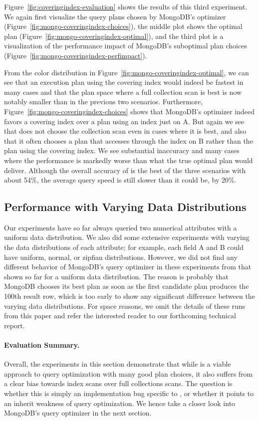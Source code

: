 Figure~\ref{fig:coveringindex-evaluation} shows the results of this third experiment. We again first visualize the query plans chosen by MongoDB's \approachName optimizer (Figure~\ref{fig:mongo-coveringindex-choices}), the middle plot shows the optimal plan (Figure~\ref{fig:mongo-coveringindex-optimal}), and the third plot is a visualization of the performance impact of MongoDB's suboptimal plan choices 
(Figure~\ref{fig:mongo-coveringindex-perfimpact}).

From the color distribution in Figure~\ref{fig:mongo-coveringindex-optimal}, we can see that an execution plan using the covering index would indeed be fastest in many cases and that the plan space where a full collection scan is best is now notably smaller than in the previous two scenarios. Furthermore, Figure~\ref{fig:mongo-coveringindex-choices} shows that MongoDB's \approachName optimizer indeed favors a covering index over a plan using an index just on A. But again we see that \approachName does not choose the collection scan even in cases where it is best, and also that it often chooses a plan that accesses through the index on B rather than the plan using the covering index. We see substantial inaccuracy and many cases where the performance is markedly worse than what the true optimal plan would deliver. Although the overall accuracy of \approachName is the best of the three scenarios with about 54\%, the average query speed is still slower than it could be, by 20\%.

\subsection{Performance with Varying Data Distributions}
Our experiments have so far always queried two numerical attributes with a uniform data distribution. We also did some extensive experiments with varying the data distributions of each attribute; for example, each field A and B could have uniform, normal, or zipfian distributions. However, we did not find any different behavior of MongoDB's query optimizer in these experiments from that shown so far for a uniform data distribution. The reason is probably that MongoDB chooses its best plan as soon as the first candidate plan produces the 100th result row, which is too early to show any significant difference between the varying data distributions. For space reasons, we omit the details of these runs from this paper and refer the interested reader to our forthcoming technical report. 

\paragraph{\textbf{Evaluation Summary.}} Overall, the experiments in this section demonstrate that while \approachName is a viable approach to query optimization with many good plan choices, it also suffers from a clear bias towards index scans over full collections scans. The question is whether this is simply an implementation bug specific to \relname, or whether it points to an inherit weakness of \approachName query optimization. We hence take a closer look into MongoDB's query optimizer in the next section.
